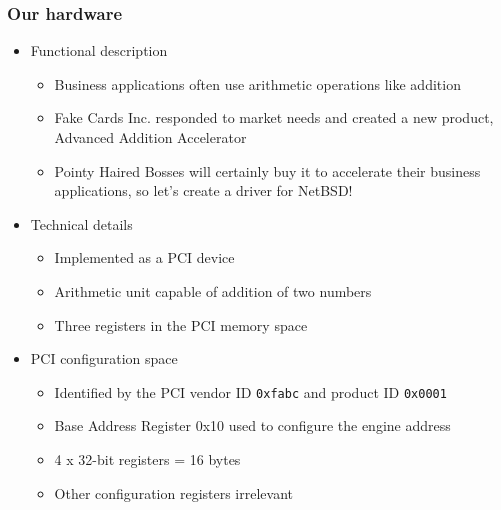 \documentclass[dvipsnames,table]{beamer}
\begin{document}
\begin{frame}
\frametitle{Our hardware}

\begin{itemize}
\item Functional description
\begin{itemize}
	\item Business applications often use arithmetic operations like addition
	\item Fake Cards Inc. responded to market needs and created a new product, Advanced Addition Accelerator
	\item Pointy Haired Bosses will certainly buy it to accelerate their business applications, so let's create a driver for NetBSD!
\end{itemize}
\item Technical details
\begin{itemize}
	\item Implemented as a PCI device
	\item Arithmetic unit capable of addition of two numbers
	\item Three registers in the PCI memory space
\end{itemize}
\item PCI configuration space
\begin{itemize}
	\item Identified by the PCI vendor ID {\tt 0xfabc} and product ID {\tt 0x0001}
	\item Base Address Register 0x10 used to configure the engine address 
	\item 4 x 32-bit registers = 16 bytes
	\item Other configuration registers irrelevant
\end{itemize}
\end{itemize}
\end{frame}
\end{document}
